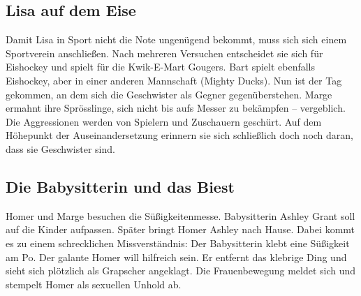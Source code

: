
	
\subsection{Lisa auf dem Eise}\label{2F05}
Damit Lisa in Sport nicht die Note ungenügend bekommt, muss sich sich einem Sportverein anschließen. Nach mehreren Versuchen entscheidet sie sich für Eishockey und spielt für die Kwik-E-Mart Gougers.
Bart spielt ebenfalls Eishockey, aber in einer anderen Mannschaft (Mighty Ducks). Nun ist der Tag gekommen, an dem sich die Geschwister als Gegner gegenüberstehen. Marge ermahnt ihre Sprösslinge, sich nicht bis aufs Messer zu bekämpfen -- vergeblich. Die Aggressionen werden von Spielern und Zuschauern geschürt. Auf dem Höhepunkt der Auseinandersetzung erinnern sie sich schließlich doch noch daran, dass sie Geschwister sind.

	
\subsection{Die Babysitterin und das Biest}
Homer und Marge besuchen die Süßigkeitenmesse. Babysitterin Ashley Grant soll auf die Kinder aufpassen. Später bringt Homer Ashley nach Hause. Dabei kommt es zu einem schrecklichen Missverständnis: Der Babysitterin klebt eine Süßigkeit am Po. Der galante Homer will hilfreich sein. Er entfernt das klebrige Ding und sieht sich plötzlich als Grapscher angeklagt. Die Frauenbewegung meldet sich und stempelt Homer als sexuellen Unhold ab.

